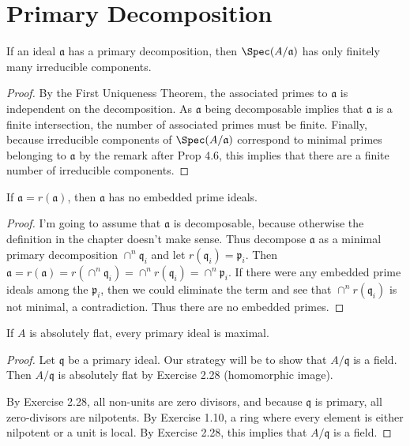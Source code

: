 \newif\ifhint
\hinttrue
\section{Primary Decomposition}

\begin{exercise}
	If an ideal $\mathfrak{a}$ has a primary decomposition, then $\Spec(A/\mathfrak{a})$ has only finitely many irreducible components.
\end{exercise}
\begin{proof}
	By the First Uniqueness Theorem, the associated primes to $\mathfrak{a} $ is independent on the decomposition.
	As $\mathfrak{a} $ being decomposable implies that $\mathfrak{a} $ is a finite intersection, the number of associated primes must be finite.
	Finally, because irreducible components of $\Spec(A / \mathfrak{a}) $ correspond to minimal primes belonging to $\mathfrak{a} $ by the remark after Prop 4.6, this implies that there are a finite number of irreducible components.
\end{proof}

\begin{exercise}
	If $\mathfrak{a} = r(\mathfrak{a})$, then $\mathfrak{a}$ has no embedded prime ideals. 
\end{exercise}
\begin{proof}
	I'm going to assume that $\mathfrak{a} $ is decomposable, because otherwise the definition in the chapter doesn't make sense.
	Thus decompose $\mathfrak{a} $ as a minimal primary decomposition $\cap^n \mathfrak{q}_i $ and let $r(\mathfrak{q}_i) = \mathfrak{p}_i $.
	Then $\mathfrak{a} = r(\mathfrak{a}) = r(\cap^n \mathfrak{q}_i) = \cap^n r(\mathfrak{q}_i) = \cap^n \mathfrak{p}_i$.
	If there were any embedded prime ideals among the $\mathfrak{p}_i $, then we could eliminate the term and see that $\cap^n r(\mathfrak{q}_i) $ is not minimal, a contradiction.
	Thus there are no embedded primes.
\end{proof}

\begin{exercise}
	If $A$ is absolutely flat, every primary ideal is maximal. 
\end{exercise}
\begin{proof}
	Let $\mathfrak{q} $ be a primary ideal.
	Our strategy will be to show that $A / \mathfrak{q} $ is a field.
	Then $A / \mathfrak{q} $ is absolutely flat by Exercise 2.28 (homomorphic image).

	By Exercise 2.28, all non-units are zero divisors, and because $\mathfrak{q} $ is primary, all zero-divisors are nilpotents.
	By Exercise 1.10, a ring where every element is either nilpotent or a unit is local.
	By Exercise 2.28, this implies that $A / \mathfrak{q} $ is a field.
\end{proof}


